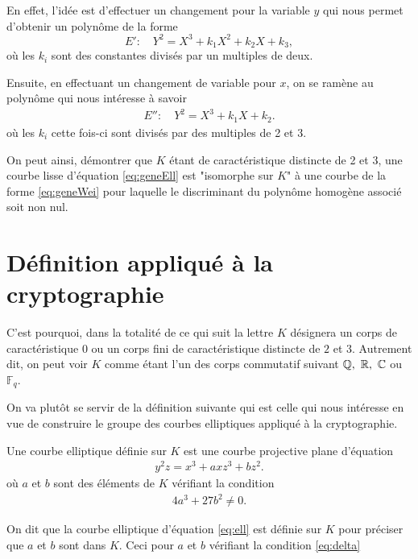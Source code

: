 En effet, l'idée est d'effectuer un changement pour la variable $y$ qui nous permet
d'obtenir un polynôme de la forme
\[
E' :\quad Y^2 = X^3 + k_1X^2 + k_2X + k_3
,\] 
où les $k_{i}$ sont des constantes divisés par un multiples de deux.

Ensuite, en effectuant un changement de variable pour $x$, on se ramène au polynôme qui nous
intéresse à savoir 
\begin{align}
    \label{eq:geneWei}
E'' :\quad Y^2 = X^3 + k_1X + k_2
.\end{align}
où les $k_{i}$ cette fois-ci sont divisés par des multiples de 2 et 3.

On peut ainsi, démontrer que $K$ étant de caractéristique distincte de 2 et 3, une courbe
lisse d'équation \eqref{eq:geneEll} est "isomorphe sur $K$" à une courbe de la forme
\eqref{eq:geneWei} pour laquelle le discriminant du polynôme homogène
associé soit non nul. 

\section{Définition appliqué à la cryptographie}

C'est pourquoi, dans la totalité de ce qui suit la lettre $K$ désignera un corps de caractéristique $0$ ou un
corps fini de caractéristique distincte de $2$ et $3$. Autrement dit, on peut voir $K$
comme étant l'un des corps commutatif suivant $\mathbb{Q},\ \mathbb{R},\ \mathbb{C}$ ou $\mathbb{F}_{q}$.


On va plutôt se servir de la définition suivante qui est celle qui nous intéresse en
vue de construire le groupe des courbes elliptiques appliqué à la cryptographie.

\begin{definition}
    \label{def:ell}
    Une courbe elliptique définie sur $K$ est une courbe projective plane d'équation
    \begin{align}
        \label{eq:ell}
    y^2z=x^3+axz^3+bz^2
    .\end{align}
    où $a$ et $b$ sont des éléments de $K$ vérifiant la condition
    \begin{align}
        \label{eq:delta}
    4a^3+27b^2\neq 0
    .\end{align}
\end{definition}

\begin{remarque}
On dit que la courbe elliptique d'équation \ref{eq:ell} est définie sur $K$ pour préciser
que $a$ et $b$ sont dans $K$. Ceci pour $a$ et $b$ vérifiant la condition \eqref{eq:delta} 
\end{remarque}


